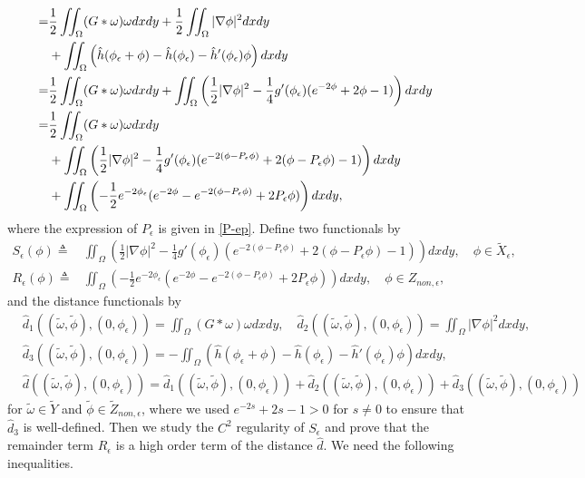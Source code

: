 \documentclass[1 [leqno, 11pt]{amsart}
\numberwithin{equation}{section}
\let\ep=\epsilon
\begin{document}
\begin{CJK*}{GBK}{song}
\begin{align}
=&{1\over2}\iint_{\Omega}(G\ast\omega)\omega dxdy+{1\over2}\iint_{\Omega}|\nabla\phi|^2dxdy\\\nonumber
&+\iint_{\Omega}\left(\hat h(\phi_\ep+\phi)-\hat h(\phi_\ep)-\hat h'(\phi_\ep)\phi \right)dxdy\\\nonumber
=&{1\over2}\iint_{\Omega}(G\ast\omega)\omega dxdy+\iint_{\Omega} \left(\frac 1 2 |\nabla \phi|^2 -\frac 1 4 g'(\phi_\ep)(e^{-2\phi} + 2\phi - 1)\right) dxdy\\\nonumber
=&{1\over2}\iint_{\Omega}(G\ast\omega)\omega dxdy\\\nonumber
&+\iint_{\Omega} \left(\frac 1 2 |\nabla \phi|^2 -\frac 1 4 g'(\phi_\ep)(e^{-2(\phi-P_\ep\phi)} + 2(\phi-P_\ep\phi) - 1)\right) dxdy\\\label{H-omega-phi}
&+\iint_{\Omega} \left(-\frac 1 2e^{-2\phi_\ep}(e^{-2\phi}-e^{-2(\phi-P_\ep\phi)} + 2P_\ep\phi)\right) dxdy,
\end{align}
where the expression of  $P_\ep$ is given in \eqref{P-ep}.
Define two  functionals by
\begin{align}\nonumber
S_\ep( \phi)\triangleq &
\iint_{\Omega} \left(\frac 1 2 |\nabla \phi|^2 -\frac 1 4 g'(\phi_\ep)(e^{-2(\phi-P_\ep\phi)} + 2(\phi-P_\ep\phi) - 1)\right) dxdy,\quad \phi\in \tilde X_\ep,\\\label{def-functional-S}
R_\ep( \phi)\triangleq &\iint_{\Omega} \left(-\frac 1 2e^{-2\phi_\ep}(e^{-2\phi}-e^{-2(\phi-P_\ep\phi)} + 2P_\ep\phi)\right) dxdy,\quad \phi\in Z_{non,\ep},
\end{align}
and the distance functionals by
\begin{align}\nonumber
&\hat d_{1}((\tilde\omega,\tilde \phi),(0,\phi_\ep))=\iint_{\Omega}(G\ast\omega)\omega dxdy,\quad
\hat d_{2}((\tilde\omega,\tilde \phi),(0,\phi_\ep))=\iint_{\Omega}|\nabla\phi|^2dxdy,\\\label{distance3-mhd}
&\hat d_{3}((\tilde\omega,\tilde \phi),(0,\phi_\ep))=-\iint_{\Omega}\left(\hat h(\phi_\ep+\phi)-\hat h(\phi_\ep)-\hat h'(\phi_\ep)\phi \right)dxdy,\\\label{distance-mhd}
&\hat d((\tilde\omega,\tilde \phi),(0,\phi_\ep))=\hat d_{1}((\tilde\omega,\tilde \phi),(0,\phi_\ep))+\hat d_{2}((\tilde\omega,\tilde \phi),(0,\phi_\ep))+\hat d_{3}((\tilde\omega,\tilde \phi),(0,\phi_\ep))
\end{align}
for $\tilde \omega\in \tilde Y$ and $\tilde \phi\in\tilde  Z_{non,\ep}$, where we used $e^{-2s} + 2s - 1>0$ for $s\neq 0$ to ensure that $\hat d_3$ is well-defined.
Then we study the $C^2$ regularity of   $S_\ep$ and prove that the remainder term $R_\ep$ is a high order term of the distance $\hat d$. We need the following inequalities.

\end{CJK*}
\end{document}
